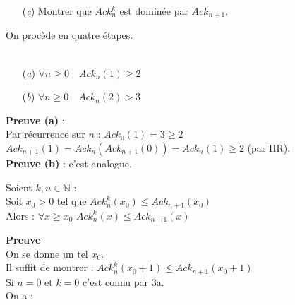 \documentclass[12pt,letterpaper,boxed]{hmcpset}
\begin{document}
\begin{solution}
\begin{solution}[(b)]
\begin{itemize}
\end{itemize}


\end{solution}

\begin{problem}
\begin{itemize}  
  \item[(\textit{c})]  Montrer que $Ack^{k}_{n}$ est dominée par $Ack_{n+1}$.
 \end{itemize}

\end{problem}



\begin{solution}[(c)]

On procède en quatre étapes. \\ \\
\begin{problem}[Lemme 0]
\begin{itemize}
  \item[(\textit{a})] $ \forall n \geq 0 \quad Ack_{n}(1) \geq 2 $
  \item[(\textit{b})] $  \forall n \geq 0 \quad Ack_{n}(2) > 3 $
\end{itemize}
\end{problem}

\begin{solution}
\noindent \textbf{Preuve (a)} : \\
Par récurrence sur $n$ : $Ack_{0}(1) = 3 \geq 2 $ \\
$Ack_{n+1}(1) = Ack_{n}(Ack_{n+1}(0)) = Ack_{n}(1) \geq 2$ (par HR). \\
\noindent \textbf{Preuve (b)} : c'est analogue. 
\end{solution}


\newpage

\begin{problem}[Lemme 1]
Soient $k,n \in \mathbb{N}$ : \\
Soit $x_0 > 0$ tel que 
$Ack^{k}_{n}(x_{0}) \leq Ack_{n+1}(x_{0})$ \\
Alors : $ \forall x \geq x_{0} \, \, Ack^{k}_{n}(x) \leq Ack_{n+1}(x)  $
\end{problem}
\begin{solution}
\noindent \textbf{Preuve}\\
On se donne un tel $x_0$.\\
Il suffit de montrer : $ Ack^{k}_{n}(x_{0}+1) \leq Ack_{n+1}(x_{0}+1) $ \\
Si $n = 0$ et $k=0$ c'est connu par 3a. \\
On a : 


\end{solution}
\end{solution}
\end{solution}
\end{document}
